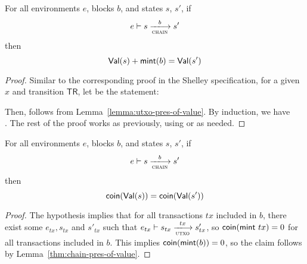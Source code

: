 \begin{theorem}
  \label{thm:chain-pres-of-value}
  For all environments $e$, blocks $b$, and states $s$, $s'$, if
  \begin{equation*}
    e\vdash s\trans{chain}{b}s'
  \end{equation*}
  then
  \begin{equation*}
    \mathsf{Val}(s) + \mathsf{mint}(b) = \mathsf{Val}(s')
  \end{equation*}
\end{theorem}
\begin{proof}
  Similar to the corresponding proof in the Shelley specification,
  for a given $x$ and transition $\mathsf{TR}$, let 
  be the statement:

  \noindent
  Then,  follows from
  Lemma~\ref{lemma:utxo-pres-of-value}.  By induction, we have \\
  . The rest of the proof works as
  previously, using  or  as needed.
\end{proof}

\begin{theorem}
  \label{thm:chain-pres-of-ada}
  For all environments $e$, blocks $b$, and states $s$, $s'$, if
  \begin{equation*}
    e\vdash s\trans{chain}{b}s'
  \end{equation*}
  then
  \begin{equation*}
    \mathsf{coin}(\mathsf{Val}(s)) = \mathsf{coin}(\mathsf{Val}(s'))
  \end{equation*}
\end{theorem}
\begin{proof}
  The hypothesis implies that for all transactions $tx$ included in
  $b$, there exist some $e_{tx}, s_{tx}$ and $s'_{tx}$ such that
  $e_{tx}\vdash s_{tx}\trans{utxo}{tx}s'_{tx}$, so
  $\mathsf{coin}(\mathsf{mint}~tx) = 0$ for all transactions included
  in $b$. This implies $\mathsf{coin}(\mathsf{mint}(b)) = 0$, so the
  claim follows by Lemma~\ref{thm:chain-pres-of-value}.
\end{proof}